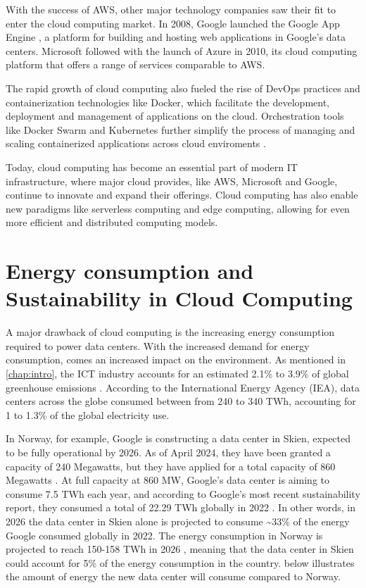 \documentclass[
  table]{report}
\begin{document}
With the success of AWS, other major technology companies saw their fit
to enter the cloud computing market. In 2008, Google launched the Google
App Engine \citep{mcdonaldIntroducingGoogleApp2008}, a platform for
building and hosting web applications in Google's data centers.
Microsoft followed with the launch of Azure in 2010, its cloud computing
platform that offers a range of services comparable to AWS.

The rapid growth of cloud computing also fueled the rise of DevOps
practices and containerization technologies like Docker, which
facilitate the development, deployment and management of applications on
the cloud. Orchestration tools like Docker Swarm and Kubernetes further
simplify the process of managing and scaling containerized applications
across cloud enviroments \citep{bernsteinContainersCloudLXC2014}.

Today, cloud computing has become an essential part of modern IT
infrastructure, where major cloud provides, like AWS, Microsoft and
Google, continue to innovate and expand their offerings. Cloud computing
has also enable new paradigms like serverless computing and edge
computing, allowing for even more efficient and distributed computing
models. \citep{baldiniServerlessComputingCurrent2017}

\section{Energy consumption and Sustainability in Cloud Computing}

A major drawback of cloud computing is the increasing energy consumption
required to power data centers. With the increased demand for energy
consumption, comes an increased impact on the environment. As mentioned
in \cref{chap:intro}, the ICT industry accounts for an estimated 2.1\%
to 3.9\% of global greenhouse emissions \citep{freitag2021}. According
to the International Energy Agency (IEA), data centers across the globe
consumed between from 240 to 340 TWh, accounting for 1 to 1.3\% of the
global electricity use.

In Norway, for example, Google is constructing a data center in Skien,
expected to be fully operational by 2026. As of April 2024, they have
been granted a capacity of 240 Megawatts, but they have applied for a
total capacity of 860 Megawatts
\citep{rivrudInvesteringenAvGooglesenter2024}. At full capacity at 860
MW, Google's data center is aiming to consume 7.5 TWh each year, and
according to Google's most recent sustainability report, they consumed a
total of 22.29 TWh globally in 2022 \citep{Google2023Environmental2023}.
In other words, in 2026 the data center in Skien alone is projected to
consume \textasciitilde33\% of the energy Google consumed globally in
2022. The energy consumption in Norway is projected to reach 150-158 TWh
in 2026 \citep{gunnerodStatnettAnalyse2022}, meaning that the data
center in Skien could account for 5\% of the energy consumption in the
country.  below illustrates the amount of energy
the new data center will consume compared to Norway.
\end{document}
